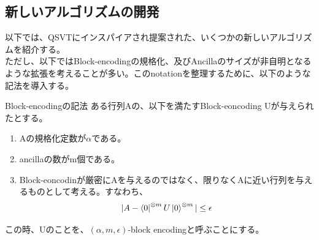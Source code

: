 \documentclass[a4paper,10.5pt]{article}
\numberwithin{equation}{section}
\begin{document}
\subsection{新しいアルゴリズムの開発}
以下では、QSVTにインスパイアされ提案された、いくつかの新しいアルゴリズムを紹介する。\\
ただし、以下ではBlock-encodingの規格化、及びAncillaのサイズが非自明となるような拡張を考えることが多い。このnotationを整理するために、以下のような記法を導入する。
\begin{defbox}{Block-encodingの記法}
    ある行列Aの、以下を満たすBlock-eoncoding Uが与えられたとする。
    \begin{enumerate}
        \item Aの規格化定数が$\alpha$である。
        \item ancillaの数がm個である。
        \item Block-eoncodinが厳密にAを与えるのではなく、限りなくAに近い行列を与えるものとして考える。すなわち、
        \begin{align*}
            |A-\bra{0}^{\otimes m}U\ket{0}^{\otimes m}|\leq \epsilon
        \end{align*}
    \end{enumerate}
    この時、Uのことを、$(\alpha,m,\epsilon)$-block encodingと呼ぶことにする。
\end{defbox}
\end{document}
